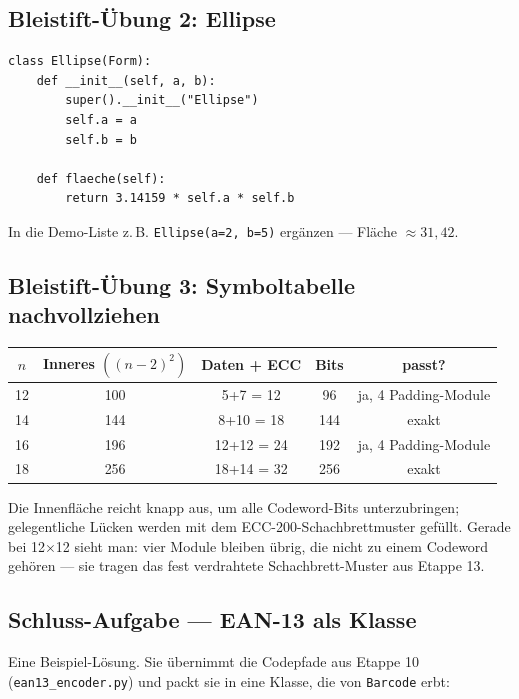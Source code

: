 \subsection*{Bleistift-Übung 2: Ellipse}

\begin{verbatim}
class Ellipse(Form):
    def __init__(self, a, b):
        super().__init__("Ellipse")
        self.a = a
        self.b = b

    def flaeche(self):
        return 3.14159 * self.a * self.b
\end{verbatim}

In die Demo-Liste z.\,B. \texttt{Ellipse(a=2, b=5)} ergänzen —
Fläche $\approx 31{,}42$.

\subsection*{Bleistift-Übung 3: Symboltabelle nachvollziehen}

\begin{center}
\begin{tabular}{c | c | c | c | c}
\toprule
$n$ & Inneres $((n{-}2)^2)$ & Daten + ECC & Bits & passt? \\
\midrule
12 & 100  & 5+7 = 12   & 96  & ja, 4 Padding-Module \\
14 & 144  & 8+10 = 18  & 144 & exakt \\
16 & 196  & 12+12 = 24 & 192 & ja, 4 Padding-Module \\
18 & 256  & 18+14 = 32 & 256 & exakt \\
\bottomrule
\end{tabular}
\end{center}

Die Innenfläche reicht knapp aus, um alle Codeword-Bits unter­zubringen;
gelegentliche Lücken werden mit dem ECC-200-Schachbrettmuster gefüllt.
Gerade bei 12$\times$12 sieht man: vier Module bleiben übrig, die
nicht zu einem Codeword gehören — sie tragen das fest verdrahtete
Schachbrett-Muster aus Etappe 13.

\subsection*{Schluss-Aufgabe — EAN-13 als Klasse}

Eine Beispiel-Lösung. Sie übernimmt die Codepfade aus
Etappe 10 (\texttt{ean13\_encoder.py}) und packt sie in eine Klasse,
die von \texttt{Barcode} erbt:

